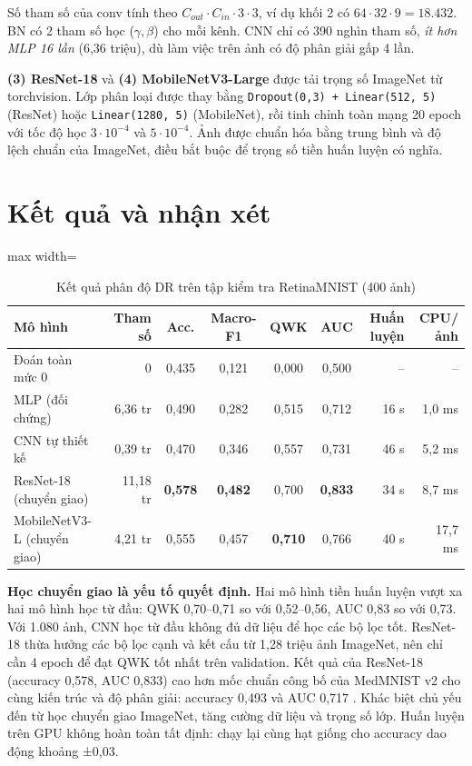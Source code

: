 Số tham số của conv tính theo $C_{out}\cdot C_{in}\cdot 3\cdot 3$, ví dụ khối 2 có $64\cdot32\cdot9 = 18.432$. BN có 2 tham số học ($\gamma, \beta$) cho mỗi kênh. CNN chỉ có 390 nghìn tham số, \emph{ít hơn MLP 16 lần} (6,36 triệu), dù làm việc trên ảnh có độ phân giải gấp 4 lần.

\textbf{(3) ResNet-18} và \textbf{(4) MobileNetV3-Large} được tải trọng số ImageNet từ torchvision. Lớp phân loại được thay bằng \texttt{Dropout(0,3) + Linear(512, 5)} (ResNet) hoặc \texttt{Linear(1280, 5)} (MobileNet), rồi tinh chỉnh toàn mạng 20 epoch với tốc độ học $3\cdot10^{-4}$ và $5\cdot10^{-4}$. Ảnh được chuẩn hóa bằng trung bình và độ lệch chuẩn của ImageNet, điều bắt buộc để trọng số tiền huấn luyện có nghĩa.

\section{Kết quả và nhận xét}

\begin{table}[H]
\centering
\caption{Kết quả phân độ DR trên tập kiểm tra RetinaMNIST (400 ảnh)}
\label{tab:ch3-results}
\small
\begin{adjustbox}{max width=\linewidth}
\begin{tabular}{@{}lrccccrr@{}}
\toprule
\textbf{Mô hình} & \textbf{Tham số} & \textbf{Acc.} & \textbf{Macro-F1} & \textbf{QWK} & \textbf{AUC} & \textbf{Huấn luyện} & \textbf{CPU/ảnh} \\
\midrule
Đoán toàn mức 0 & 0 & 0,435 & 0,121 & 0,000 & 0,500 & -- & -- \\
MLP (đối chứng) & 6,36 tr & 0,490 & 0,282 & 0,515 & 0,712 & 16 s & 1,0 ms \\
CNN tự thiết kế & 0,39 tr & 0,470 & 0,346 & 0,557 & 0,731 & 46 s & 5,2 ms \\
ResNet-18 (chuyển giao) & 11,18 tr & \textbf{0,578} & \textbf{0,482} & 0,700 & \textbf{0,833} & 34 s & 8,7 ms \\
MobileNetV3-L (chuyển giao) & 4,21 tr & 0,555 & 0,457 & \textbf{0,710} & 0,766 & 40 s & 17,7 ms \\
\bottomrule
\end{tabular}
\end{adjustbox}
\end{table}


\textbf{Học chuyển giao là yếu tố quyết định.} Hai mô hình tiền huấn luyện vượt xa hai mô hình học từ đầu: QWK 0,70–0,71 so với 0,52–0,56, AUC 0,83 so với 0,73. Với 1.080 ảnh, CNN học từ đầu không đủ dữ liệu để học các bộ lọc tốt. ResNet-18 thừa hưởng các bộ lọc cạnh và kết cấu từ 1,28 triệu ảnh ImageNet, nên chỉ cần 4 epoch để đạt QWK tốt nhất trên validation. Kết quả của ResNet-18 (accuracy 0,578, AUC 0,833) cao hơn mốc chuẩn công bố của MedMNIST v2 cho cùng kiến trúc và độ phân giải: accuracy 0,493 và AUC 0,717 \cite{yang2023medmnist}. Khác biệt chủ yếu đến từ học chuyển giao ImageNet, tăng cường dữ liệu và trọng số lớp. Huấn luyện trên GPU không hoàn toàn tất định: chạy lại cùng hạt giống cho accuracy dao động khoảng ±0,03.

